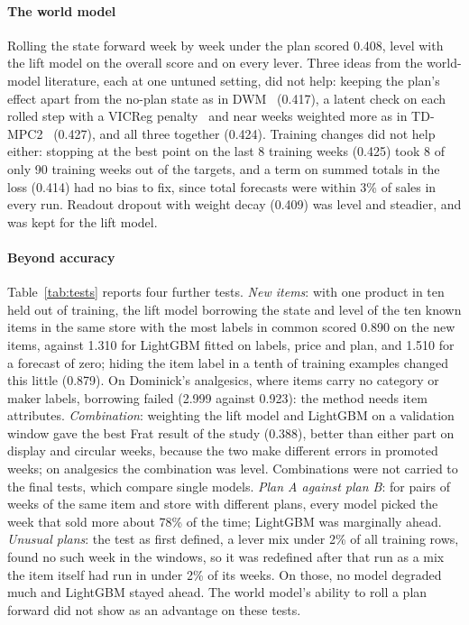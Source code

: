 \paragraph{The world model}
Rolling the state forward week by week under the plan scored 0.408, level with
the lift model on the overall score and on every lever. Three ideas from the
world-model literature, each at one untuned setting, did not help: keeping the
plan's effect apart from the no-plan state as in DWM~\cite{dwm} (0.417), a
latent check on each rolled step with a VICReg penalty~\cite{vicreg} and near
weeks weighted more as in TD-MPC2~\cite{tdmpc2} (0.427), and all three together
(0.424). Training changes did not help either: stopping at the best point on the
last 8 training weeks (0.425) took 8 of only 90 training weeks out of the
targets, and a term on summed totals in the loss (0.414) had no bias to fix,
since total forecasts were within 3\% of sales in every run. Readout dropout
with weight decay (0.409) was level and steadier, and was kept for the lift
model.



\paragraph{Beyond accuracy}
Table~\ref{tab:tests} reports four further tests. \emph{New items}: with one
product in ten held out of training, the lift model borrowing the state and
level of the ten known items in the same store with the most labels in common
scored 0.890 on the new items, against 1.310 for LightGBM fitted on labels,
price and plan, and 1.510 for a forecast of zero; hiding the item label in a tenth of training
examples changed this little (0.879). On Dominick's analgesics,
where items carry no category or maker labels, borrowing failed (2.999 against
0.923): the method needs item attributes. \emph{Combination}: weighting the lift
model and LightGBM on a validation window gave the best Frat result of the study
(0.388), better than either part on display and circular weeks, because the two
make different errors in promoted weeks; on analgesics the combination was
level. Combinations were not carried to the final tests, which compare single
models. \emph{Plan A against plan B}: for pairs of weeks of the same item and
store with different plans, every model picked the week that sold more about
78\% of the time; LightGBM was marginally ahead. \emph{Unusual plans}: the
test as first defined, a lever mix under 2\% of all training rows, found no
such week in the windows, so it was redefined after that run as a mix the item
itself had run in under 2\% of its weeks. On those, no model degraded much and
LightGBM stayed ahead. The world model's ability to roll a plan forward did not
show as an advantage on these tests.

